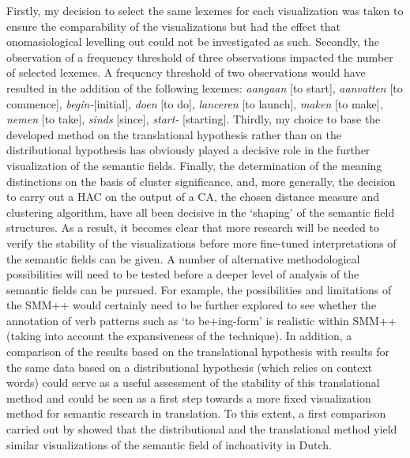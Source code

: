 Firstly, my decision to select the same lexemes for each visualization was taken to ensure the comparability of the visualizations but had the effect that onomasiological levelling out could not be investigated as such. Secondly, the observation of a frequency threshold of three observations impacted the number of selected lexemes. A frequency threshold of two observations would have resulted in the addition of the following lexemes: \textit{aangaan} [to start], \textit{aanvatten} [to commence], \textit{begin-}[initial], \textit{doen} [to do], \textit{lanceren} [to launch], \textit{maken} [to make], \textit{nemen} [to take], \textit{sinds} [since], \textit{start-} [starting]. Thirdly, my choice to base the developed method on the translational hypothesis rather than on the distributional hypothesis has obviously played a decisive role in the further visualization of the semantic fields. Finally, the determination of the meaning distinctions on the basis of cluster significance, and, more generally, the decision to carry out a HAC on the output of a CA, the chosen distance measure and clustering algorithm, have all been decisive in the ‘shaping’ of the semantic field structures. As a result, it becomes clear that more research will be needed to verify the stability of the visualizations before more fine-tuned interpretations of the semantic fields can be given. A number of alternative methodological possibilities will need to be tested before a deeper level of analysis of the semantic fields can be pursued. For example, the possibilities and limitations of the SMM++ would certainly need to be further explored to see whether the annotation of verb patterns such as ‘to be+ing-form’ is realistic within SMM++ (taking into account the expansiveness of the technique). In addition, a comparison of the results based on the translational hypothesis with results for the same data based on a distributional hypothesis (which relies on context words) could serve as a useful assessment of the stability of this translational method and could be seen as a first step towards a more fixed visualization method for semantic research in translation. To this extent, a first comparison carried out by \citet{vandevoorde_distributional_2016} showed that the distributional and the translational method yield similar visualizations of the semantic field of inchoativity in Dutch.

